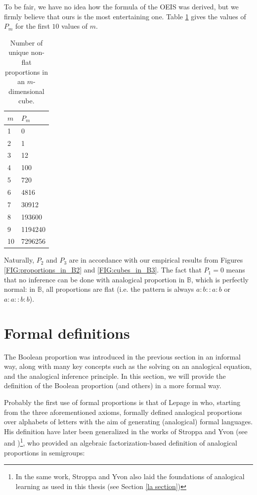To be fair, we have no idea how the formula of the OEIS was derived, but we
firmly believe that ours is the most entertaining one. Table
\ref{TAB:n_params_in_cube} gives the values of $P_m$ for the first $10$ values
of $m$.
\begin{table}[h!]
\centering
  \begin{tabular}{ l  l }
\toprule
 $m$ & $P_m$\\
\midrule
    1	&	0\\
    2 &	1\\
    3	&	12\\
    4	&	100\\
    5 &	720\\
    6 &	4816\\
    7 &	30912\\
    8 &	193600\\
    9 & 1194240\\
    10 & 7296256\\
\bottomrule
\end{tabular}
\caption{Number of unique non-flat proportions in an $m$-dimensional cube.}
\label{TAB:n_params_in_cube}
\end{table}
Naturally, $P_2$ and $P_3$ are in accordance with our empirical  results from
Figures \ref{FIG:proportions_in_B2} and \ref{FIG:cubes_in_B3}. The fact that
$P_1 = 0$ means that no inference can be done with analogical proportion in
$\mathbb{B}$, which is perfectly normal: in $\mathbb{B}$, all proportions are
flat (i.e. the pattern is always $a:b::a:b$ or $a:a::b:b$).

\section{Formal definitions}
\label{SEC:formal_definitions_proportions}

The Boolean proportion was introduced in the previous section in an informal
way, along with many key concepts such as the solving on an analogical
equation, and the analogical inference principle. In this section, we will
provide the definition of the Boolean proportion (and others) in a more formal
way.

Probably the first use of formal proportions is that of Lepage in
\cite{Lep04} who, starting from the three aforementioned axioms, formally
defined analogical proportions over alphabets of letters with the aim of
generating (analogical) formal languages. His definition have later been
generalized in the works of Stroppa and Yvon (see \cite{StrYvoCNLL05} and
\cite{StrYvoREPORT05})\footnote{In the same work, Stroppa and Yvon also laid
the foundations of analogical learning as used in this thesis (see Section
\ref{la section})}, who provided an algebraic factorization-based definition of
analogical proportions in semigroups:

